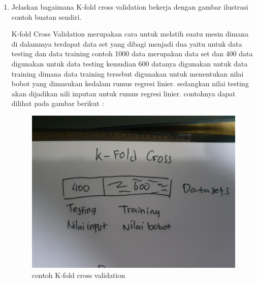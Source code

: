 \begin{enumerate}
		\item Jelaskan bagaimana K-fold cross validation bekerja dengan gambar ilustrasi contoh buatan sendiri. \par
		K-fold Cross Validation merupakan cara untuk melatih suatu mesin dimana di dalammya terdapat data set yang dibagi menjadi dua yaitu untuk data testing dan data training contoh 1000 data merupakan data set dan 400 data digunakan untuk data testing kemudian 600 datanya digunakan untuk data training dimana data training tersebut digunakan untuk menentukan nilai bobot yang dimasukan kedalam rumus regresi linier. sedangkan nilai testing akan dijadikan nili inputan untuk rumus regresi linier. contohnya dapat dilihat pada gambar berikut :
		\begin{figure}[ht]
			\centering
			\includegraphics[scale=0.01]{figures/1174043/chapter2/7.jpg}
			\caption{contoh K-fold cross validation}
			\label{contoh}
		\end{figure}
		

\end{enumerate}
